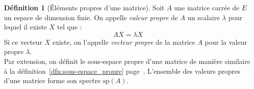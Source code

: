 \documentclass[11pt,a4paper]{report}
\theoremstyle{definition}
\newtheorem{dfn}[theorem]{Définition}
\begin{document}
\begin{dfn}[Éléments propres d'une matrice]
		Soit $A$ une matrice carrée de $E$ un espace de dimension finie. \newline
		On appelle \emph{valeur propre} de $A$ un scalaire $\lambda$ pour lequel il existe $X$ tel que :
		\begin{equation}
			  AX = \lambda X
        \end{equation}
        Si ce vecteur $X$ existe, on l'appelle \emph{vecteur propre} de la matrice $A$ pour la valeur propre $\lambda$.\\[\baselineskip]
        Par extension, on définit le sous-espace propre d'une matrice de manière similaire à la définition~\ref{dfn:sous-espace_propre} page~\pageref{dfn:sous-espace_propre}. L'ensemble des valeurs propres d'une matrice forme son spectre $\mathrm{sp}(A)$.
\end{dfn}


\end{document}
